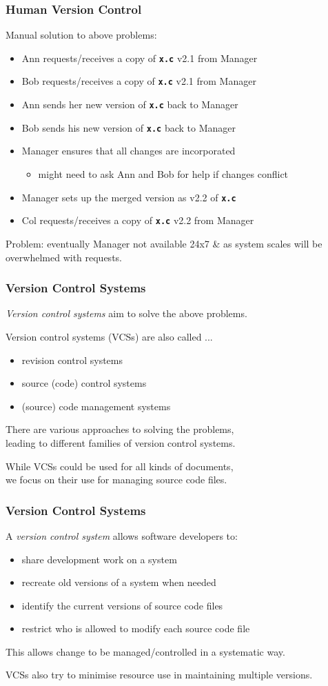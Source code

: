 \begin{frame}
\frametitle{Human Version Control}
Manual solution to above problems:
\begin{itemize}
\item  Ann requests/receives a copy of \textbf{\tt{x.c}} v2.1 from Manager
\item  Bob requests/receives a copy of \textbf{\tt{x.c}} v2.1 from Manager
\item  Ann sends her new version of \textbf{\tt{x.c}} back to Manager
\item  Bob sends his new version of \textbf{\tt{x.c}} back to Manager
\item  Manager ensures that all changes are incorporated
{\small 
\begin{itemize}
\item  might need to ask Ann and Bob for help if changes conflict
\end{itemize}
}
\item  Manager sets up the merged version as v2.2 of \textbf{\tt{x.c}}
\item  Col requests/receives a copy of \textbf{\tt{x.c}} v2.2 from Manager
\end{itemize}
Problem: eventually Manager not available 24x7 \& as system scales
will be overwhelmed with requests.
\end{frame}

\begin{frame}
\frametitle{Version Control Systems}
{\em{Version control systems}} aim to solve the above problems.

Version control systems (VCSs) are also called ...
\begin{itemize}
\item  revision control systems
\item  source (code) control systems
\item  (source) code management systems
\end{itemize}
There are various approaches to solving the problems, \\
leading to different families of version control systems.

While VCSs could be used for all kinds of documents, \\
we focus on their use for managing source code files.
\end{frame}

\begin{frame}
\frametitle{Version Control Systems}
A {\em{version control system}} allows software developers to:
\begin{itemize}
\item  share development work on a system
\item  recreate old versions of a system when needed
\item  identify the current versions of source code files
\item  restrict who is allowed to modify each source code file
\end{itemize}
This allows change to be managed/controlled in a systematic way.

VCSs also try to minimise resource use in maintaining multiple versions.
\end{frame}

